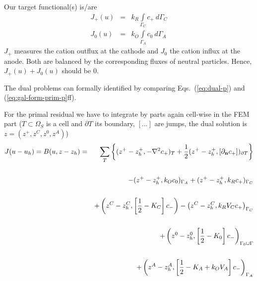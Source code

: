 \documentclass[runningheads]{lncse}
\begin{document}
%
Our target functional(s) is/are 
\begin{eqnarray}
J_+(u) & = &  k_R\int\limits_{\Gamma_C} c_+ ~d\Gamma_C \\
J_0(u) & = &  k_O\int\limits_{\Gamma_A} c_0 ~d\Gamma_A
\end{eqnarray}
%
$J_+$ measures the cation outflux at the cathode and $J_0$ the cation influx at the anode. Both are balanced by the corresponding fluxes of neutral particles. Hence, $J_+(u) + J_0(u) $ should be $0$.
%
%
%

The dual problems can formally identified by comparing Eqs.~(\ref{eq:dual-p}) and (\ref{eq:gal-form-prim-p}ff).

For the primal residual we have to integrate by parts again cell-wise in the FEM part ($T \subset \Omega_S$ is a cell and $\partial T $ its boundary, $[...]$ are jumps, the dual solution is $z = (z^+, z^{C},  z^{0},  z^{A} )$)
%
\begin{eqnarray}
J(u-u_h) =  B(u, z-z_h) & = & \sum_T \left\lbrace
( z^+ - z^+_h, - \nabla^2 c_+)_{T}  +  \frac 1 2 (z^+ - z^+_h, [\partial_{\bf n} c_+] )_{\partial T} \right\rbrace \nonumber \\
\nonumber \\
&&   - ( z^+ - z^+_h, k_O c_0 )_{\Gamma_A}  + ( z^+ - z^+_h,  k_R c_+ )_{\Gamma_C} \nonumber \\
 \nonumber \\
 &&  +
     \left( z^C - z^C_h,  \left[ \frac 1 2 - K_C\right] c_-\right)    - \left( z^C - z^C_h,  k_R V_C c_+\right)_{\Gamma_C}   \nonumber \\
\nonumber \\
&& + 
 \left( z^0 - z^0_h,  \left[ \frac 1 2 - K_0 \right] c_- \right)_{\Gamma_0 \cup \Gamma}\nonumber \\
 \nonumber \\
 && +
   \left( z^A - z^A_h,  \left[ \frac 1 2 - K_A + k_O V_A \right] c_- \right)_{\Gamma_A}
\end{eqnarray}
\end{document}
